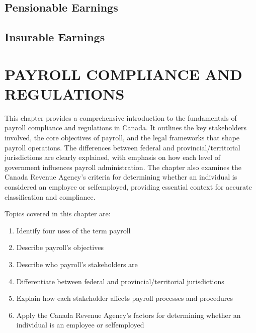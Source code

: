 \documentclass[letterpaper,10pt,english]{sphinxmanual}
\begin{document}
\section{Pensionable Earnings}
\label{\detokenize{terminology:pensionable-earnings}}

\section{Insurable Earnings}
\label{\detokenize{terminology:insurable-earnings}}
\sphinxstepscope


\chapter{PAYROLL COMPLIANCE AND REGULATIONS}
\label{\detokenize{compliance:payroll-compliance-and-regulations}}\label{\detokenize{compliance::doc}}
\sphinxAtStartPar
{}

\sphinxAtStartPar
This chapter provides a comprehensive introduction to the fundamentals of payroll compliance and regulations in Canada.
It outlines the key stakeholders involved, the core objectives of payroll, and the legal frameworks that shape payroll
operations. The differences between federal and provincial/territorial jurisdictions are clearly explained, with emphasis on
how each level of government influences payroll administration. The chapter also examines the Canada Revenue Agency’s
criteria for determining whether an individual is considered an employee or self\sphinxhyphen{}employed, providing essential context for
accurate classification and compliance.

\sphinxAtStartPar
Topics covered in this chapter are:
\begin{enumerate}
%
\item {} 
\sphinxAtStartPar
Identify four uses of the term payroll

\item {} 
\sphinxAtStartPar
Describe payroll’s objectives

\item {} 
\sphinxAtStartPar
Describe who payroll’s stakeholders are

\item {} 
\sphinxAtStartPar
Differentiate between federal and provincial/territorial jurisdictions

\item {} 
\sphinxAtStartPar
Explain how each stakeholder affects payroll processes and procedures

\item {} 
\sphinxAtStartPar
Apply the Canada Revenue Agency’s factors for determining whether an individual is an employee or self\sphinxhyphen{}employed

\end{enumerate}
\end{document}
